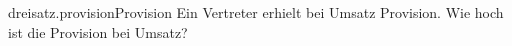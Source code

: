 \begin{exercise}{dreisatz.provision}{Provision}
  \ifproblem\problem
    Ein Vertreter erhielt bei  Umsatz  Provision.
    Wie hoch ist die Provision bei  Umsatz?
  \fi
\end{exercise}
